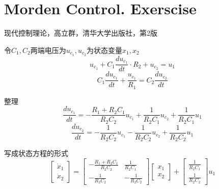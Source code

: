 \chapter{Morden Control. Exerscise}

现代控制理论，高立群，清华大学出版社，第2版 
\vspace{2em}

\begin{question}[p60,2.1]
\end{question}
\begin{mdframed}[linewidth=0pt, backgroundcolor=gray!12]
    \begin{pf}
        令$C_1,C_2$两端电压为$u_{c_1},u_{c_2}$为状态变量$x_1,x_2$
        \begin{equation}
            u_{c_1}+C_1\frac{d u_{c_1}}{dt}\cdot R_2+u_{c_2}=u_1
        \end{equation}
        \begin{equation}
            C_1\frac{d u_{c_1}}{dt}+\frac{u_{c_1}}{R_1}=C_2\frac{du_{c_2}}{dt}
        \end{equation}

        整理
        \begin{equation}
            \frac{d u_{c_1}}{dt} = -\frac{R_1+R_2C_1}{R_2C_2}u_{c_1}+\frac{1}{R_2C_1}u_{c_2}+\frac{1}{R_2C_1}u_1
        \end{equation}
        \begin{equation}
            \frac{d u_{c_2}}{dt} = -\frac{1}{R_2C_2}u_{c_1}-\frac{1}{R_2C_2}u_{c_2}+\frac{1}{R_2C_2}u_1
        \end{equation}

        写成状态方程的形式
        \begin{equation}
            \left[
                \begin{array}{c}
                    \dot{x}_1\\
                    \dot{x}_2
                \end{array}
            \right]=
            \left[
                \begin{array}{cc}
                    -\frac{R_1+R_2C_1}{R_2C_2} & \frac{1}{R_2C_1} \\
                    -\frac{1}{R_2C_2}          & -\frac{1}{R_2C_2}
                \end{array}
            \right]
            \left[
                \begin{array}{c}
                    x_1\\
                    x_2
                \end{array}
            \right]+
            \left[
                \begin{array}{c}
                    \frac{1}{R_2C_1}\\
                    \frac{1}{R_2C_2}
                \end{array}
            \right]u_1
        \end{equation}


\end{pf}
\end{mdframed}
